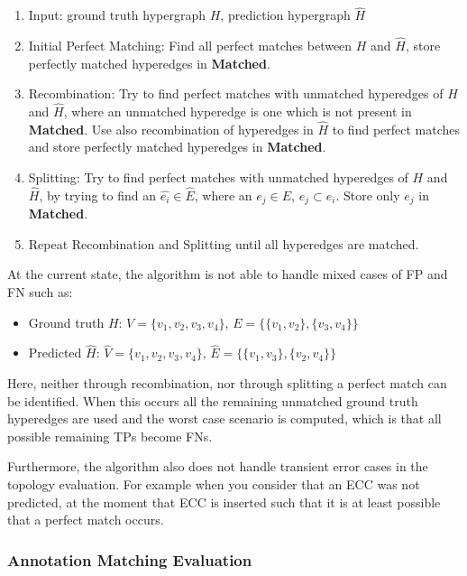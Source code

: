 \begin{enumerate}
    \item Input: ground truth hypergraph $H$, prediction hypergraph $\hat{H}$
    \item Initial Perfect Matching: Find all perfect matches between $H$ and $\hat{H}$, store perfectly matched hyperedges in \textbf{Matched}.
    \item Recombination: Try to find perfect matches with unmatched hyperedges of $H$ and $\hat{H}$, where an unmatched hyperedge is one which is not present in \textbf{Matched}.
    Use also recombination of hyperedges in $\hat{H}$ to find perfect matches and store perfectly matched hyperedges in \textbf{Matched}.
    \item Splitting: Try to find perfect matches with unmatched hyperedges of $H$ and $\hat{H}$, by trying to find an $\hat{e_i} \in \hat{E}$, where an $e_j \in E$, $e_j \subset e_i$.
    Store only $e_j$ in \textbf{Matched}.
    \item Repeat Recombination and Splitting until all hyperedges are matched.
\end{enumerate}

At the current state, the algorithm is not able to handle mixed cases of \ac{FP} and \ac{FN} such as:

\begin{itemize}
    \item Ground truth $H$: $V = \{v_1, v_2, v_3, v_4\}$, $E = \{\{v_1, v_2\}, \{v_3, v_4\}\}$
    \item Predicted $\hat{H}$: $\hat{V} = \{v_1, v_2, v_3, v_4\}$, $\hat{E} = \{\{v_1, v_3\}, \{v_2, v_4\}\}$
\end{itemize}

Here, neither through recombination, nor through splitting a perfect match can be identified.
When this occurs all the remaining unmatched ground truth hyperedges are used and the worst case scenario is computed, which is that all possible remaining \acp{TP} become \acp{FN}.

Furthermore, the algorithm also does not handle transient error cases in the topology evaluation.
For example when you consider that an \ac{ECC} was not predicted, at the moment that \ac{ECC} is inserted such that it is at least possible that a perfect match occurs.


\subsubsection{Annotation Matching Evaluation}

